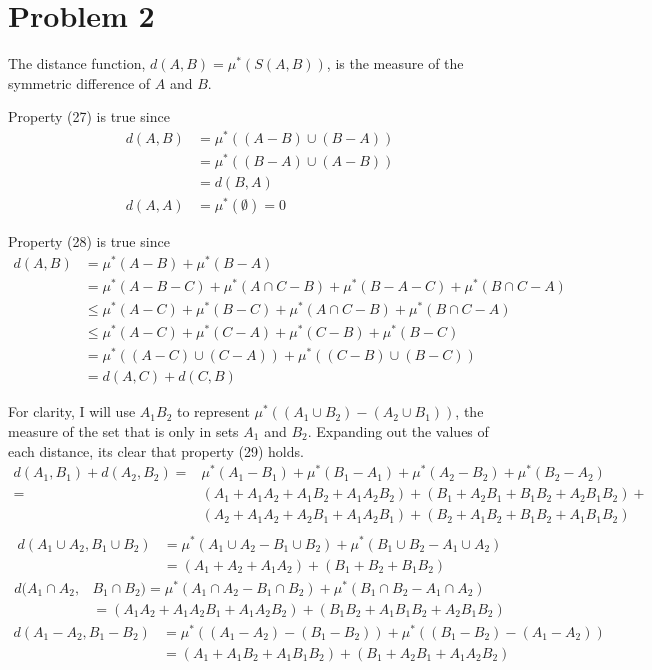 \documentclass{article}
\begin{document}
\section*{Problem 2}
  The distance function, $d(A,B) = \mu^*(S(A, B))$,
  is the measure of the symmetric difference of $A$ and $B$.

  Property (27) is true since
  \begin{align*}
    d(A,B) &= \mu^*((A-B) \cup (B-A)) \\
    &= \mu^*((B-A) \cup (A-B)) \\
    &= d(B,A) \\
    d(A,A) &= \mu^*(\emptyset) = 0
  \end{align*}

  Property (28) is true since 
  \begin{align*}
    d(A,B) &= \mu^*(A-B) + \mu^*(B-A) \\
    &= \mu^*(A-B-C) + \mu^*{(A\cap C - B)} + \mu^*(B-A-C) + \mu^*{(B\cap C - A)}\\
    &\leq \mu^*(A-C) + \mu^*(B-C) + \mu^*{(A\cap C - B)}+ \mu^*{(B\cap C - A)}\\
    &\leq \mu^*(A-C) + \mu^*(C-A) + \mu^*(C-B) + \mu^*(B-C) \\
    &= \mu^*((A-C) \cup (C-A)) + \mu^*((C-B) \cup (B-C)) \\
    &=  d(A,C) + d(C,B)
  \end{align*}

  For clarity, I will use $A_1B_2$ to represent
  $\mu^*((A_1 \cup B_2) - (A_2 \cup B_1))$,
  the measure of the set that is only in sets $A_1$ and $B_2$.
  Expanding out the values of each distance, its clear that property (29) holds.
  \begin{align*}
    d(A_1, B_1) + d(A_2, B_2) =& \mu^*(A_1-B_1) + \mu^*(B_1-A_1) + \mu^*(A_2-B_2) + \mu^*(B_2-A_2) \\
    = &(A_1 + A_1A_2 + A_1B_2 + A_1A_2B_2) + (B_1 + A_2B_1 + B_1B_2 + A_2B_1B_2) + \\
     &(A_2 + A_1A_2 + A_2B_1 + A_1A_2B_1) + (B_2 + A_1B_2 + B_1B_2 + A_1B_1B_2) \\
  \end{align*}
  \begin{align*}
    d(A_1 \cup A_2, B_1\cup B_2) &= \mu^*(A_1 \cup A_2-B_1\cup B_2) + \mu^*(B_1\cup B_2-A_1 \cup A_2) \\
    &= (A_1 + A_2 + A_1A_2) + (B_1 + B_2 + B_1B_2)
  \end{align*}
  \begin{align*}
    d(A_1 \cap A_2, &B_1\cap B_2) = \mu^*(A_1 \cap A_2-B_1\cap B_2) + \mu^*(B_1\cap B_2-A_1 \cap A_2) \\
    &= (A_1A_2 + A_1A_2B_1 + A_1A_2B_2) + (B_1B_2 + A_1B_1B_2 + A_2B_1B_2)
  \end{align*}
  \begin{align*}
    d(A_1 - A_2, B_1- B_2) &= \mu^*((A_1 - A_2)-(B_1- B_2)) + \mu^*((B_1- B_2)-(A_1 - A_2)) \\
    &= (A_1 + A_1B_2 + A_1B_1B_2) + (B_1 + A_2B_1 + A_1A_2B_2)
  \end{align*}
\newpage  
\end{document}

